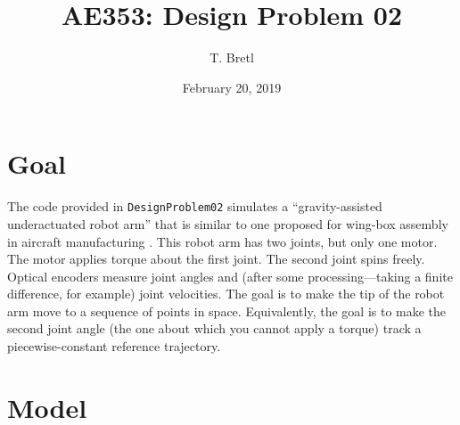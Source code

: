 \documentclass[12pt]{article}
\title{AE353: Design Problem 02}
\author{T. Bretl}
\date{February 20, 2019}
\begin{document}
\maketitle


\section{Goal}

The code provided in \lstinline!DesignProblem02! simulates a ``gravity-assisted underactuated robot arm'' that is similar to one proposed for wing-box assembly in aircraft manufacturing \cite{Roy2009}. This robot arm has two joints, but only one motor. The motor applies torque about the first joint. The second joint spins freely. Optical encoders measure joint angles and (after some processing---taking a finite difference, for example) joint velocities.
The goal is to make the tip of the robot arm move to a sequence of points in space. Equivalently, the goal is to make the second joint angle (the one about which you cannot apply a torque) track a piecewise-constant reference trajectory.

\section{Model}
\end{document}
